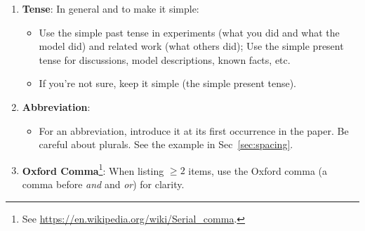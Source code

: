 \begin{enumerate}
  \item \textbf{Tense}: In general and to make it simple:
  \begin{itemize}
    \item Use the simple past tense in experiments (what you did and what the model did) and related work (what others did); Use the simple present tense for discussions, model descriptions, known facts, etc.
    \item If you're not sure, keep it simple (the simple present tense).
  \end{itemize}

  \item \textbf{Abbreviation}:
  \begin{itemize}
    \item
      For an abbreviation, introduce it at its first occurrence in the paper. Be careful about plurals.
      See the example in Sec~\ref{sec:spacing}.
  \end{itemize}

  \item \textbf{Oxford Comma}\footnote[3]{See \url{https://en.wikipedia.org/wiki/Serial\_comma}.}: When listing $\ge 2$ items, use the Oxford comma (a comma before \textit{and} and \textit{or}) for clarity.

\end{enumerate} 
